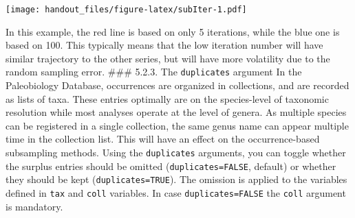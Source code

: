 \documentclass[]{article}
\newenvironment{Shaded}{\begin{snugshade}}{\end{snugshade}}
\newcommand{\CommentTok}[1]{\textcolor[rgb]{0.56,0.35,0.01}{\textit{#1}}}
\newcommand{\DataTypeTok}[1]{\textcolor[rgb]{0.13,0.29,0.53}{#1}}
\newcommand{\DecValTok}[1]{\textcolor[rgb]{0.00,0.00,0.81}{#1}}
\newcommand{\KeywordTok}[1]{\textcolor[rgb]{0.13,0.29,0.53}{\textbf{#1}}}
\newcommand{\NormalTok}[1]{#1}
\newcommand{\OperatorTok}[1]{\textcolor[rgb]{0.81,0.36,0.00}{\textbf{#1}}}
\newcommand{\OtherTok}[1]{\textcolor[rgb]{0.56,0.35,0.01}{#1}}
\newcommand{\StringTok}[1]{\textcolor[rgb]{0.31,0.60,0.02}{#1}}
\begin{document}
\texttt{[image: handout\_files/figure-latex/subIter-1.pdf]}

In this example, the red line is based on only 5 iterations, while the
blue one is based on 100. This typically means that the low iteration
number will have similar trajectory to the other series, but will have
more volatility due to the random sampling error. \#\#\# 5.2.3. The
\texttt{duplicates} argument In the Paleobiology Database, occurrences
are organized in collections, and are recorded as lists of taxa. These
entries optimally are on the species-level of taxonomic resolution while
most analyses operate at the level of genera. As multiple species can be
registered in a single collection, the same genus name can appear
multiple time in the collection list. This will have an effect on the
occurrence-based subsampling methods. Using the \texttt{duplicates}
arguments, you can toggle whether the surplus entries should be omitted
(\texttt{duplicates=FALSE}, default) or whether they should be kept
(\texttt{duplicates=TRUE}). The omission is applied to the variables
defined in \texttt{tax} and \texttt{coll} variables. In case
\texttt{duplicates=FALSE} the \texttt{coll} argument is mandatory.

\begin{Shaded}
\end{Shaded}
\end{document}
